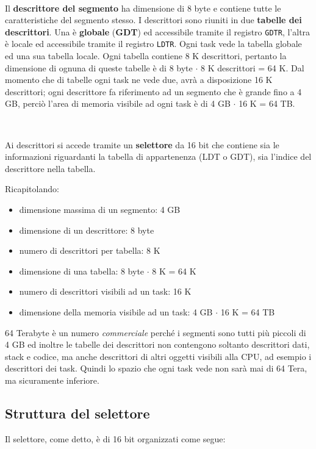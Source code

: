 \documentclass[11pt]{book}
\begin{document}
\

Il {\bf descrittore del segmento} ha dimensione di 8 byte e contiene
tutte le caratteristiche del segmento stesso. I descrittori sono
riuniti in due {\bf tabelle dei descrittori}. Una \`e {\bf globale}
(\textbf{GDT}) ed accessibile tramite il registro \texttt{GDTR},
l'altra \`e locale ed accessibile tramite il registro
\texttt{LDTR}. Ogni task vede la tabella globale ed una sua tabella
locale. Ogni tabella contiene 8 K descrittori, pertanto la dimensione
di ognuna di queste tabelle \`e di 8 byte $\cdot$ 8 K descrittori = 64
K. Dal momento che di tabelle ogni task ne vede due, avr\`a a
disposizione 16 K descrittori; ogni descrittore fa riferimento ad un
segmento che \`e grande fino a 4 GB, perci\`o l'area di memoria
visibile ad ogni task \`e di 4 GB $\cdot$ 16 K = 64 TB.

\

Ai descrittori si accede tramite un {\bf selettore} da 16 bit che
contiene sia le informazioni riguardanti la tabella di appartenenza
(LDT o GDT), sia l'indice del descrittore nella tabella.

Ricapitolando:
\begin{itemize}
\item dimensione massima di un segmento: 4 GB
\item dimensione di un descrittore: 8 byte
\item numero di descrittori per tabella: 8 K
\item dimensione di una tabella: 8 byte $\cdot$ 8 K = 64 K
\item numero di descrittori visibili ad un task: 16 K
\item dimensione della memoria visibile ad un task: 4 GB $\cdot$ 16 K
  = 64 TB
\end{itemize}

64 Terabyte \`e un numero {\em commerciale} perch\'e i segmenti sono
tutti pi\`u piccoli di 4 GB ed inoltre le tabelle dei descrittori non
contengono soltanto descrittori dati, stack e codice, ma anche
descrittori di altri oggetti visibili alla CPU, ad esempio i
descrittori dei task. Quindi lo spazio che ogni task vede non sar\`a
mai di 64 Tera, ma sicuramente inferiore.

\subsection{Struttura del selettore}

Il selettore, come detto, \`e di 16 bit organizzati come segue:
\end{document}
